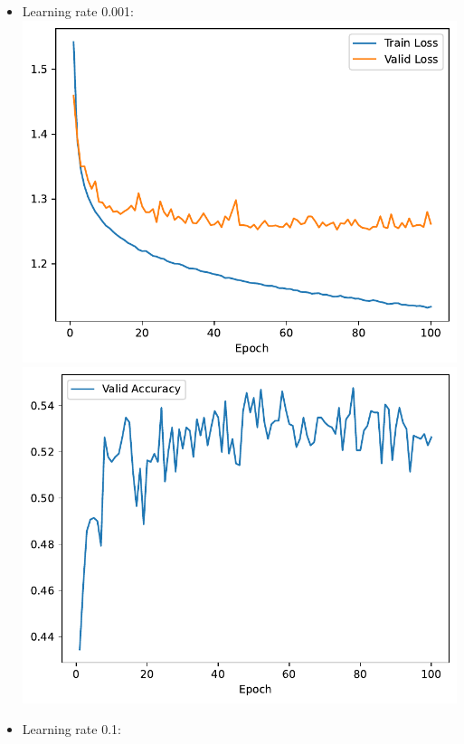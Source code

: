 \documentclass[12pt,a4paper]{article}
\begin{document}
\begin{itemize}
            \item Learning rate 0.001: \\
                \includegraphics[width=\imagewidth]{q2/q2_1_lr-0.001-training-loss.pdf}
                \includegraphics[width=\imagewidth]{q2/q2_1_lr-0.001-validation-accuracy.pdf}
            \item Learning rate 0.1: \\

\end{itemize}
\end{document}
